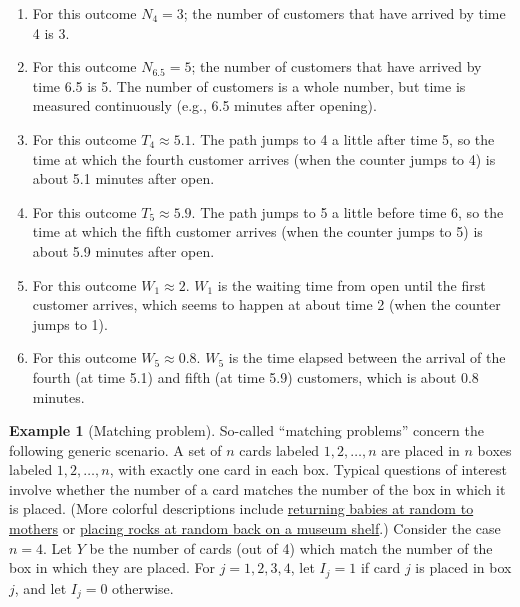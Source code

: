 \documentclass[
]{book}
\providecommand{\tightlist}{%
  \setlength{\itemsep}{0pt}\setlength{\parskip}{0pt}}
\theoremstyle{definition}
\theoremstyle{definition}
\newtheorem{example}{Example}[chapter]
\theoremstyle{definition}
\theoremstyle{remark}
\begin{document}
\begin{enumerate}
\def\labelenumi{\arabic{enumi}.}
\tightlist
\item
  For this outcome \(N_4=3\); the number of customers that have arrived by time 4 is 3.
\item
  For this outcome \(N_{6.5}=5\); the number of customers that have arrived by time 6.5 is 5. The number of customers is a whole number, but time is measured continuously (e.g., 6.5 minutes after opening).
\item
  For this outcome \(T_4\approx 5.1\). The path jumps to 4 a little after time 5, so the time at which the fourth customer arrives (when the counter jumps to 4) is about 5.1 minutes after open.
\item
  For this outcome \(T_5\approx 5.9\). The path jumps to 5 a little before time 6, so the time at which the fifth customer arrives (when the counter jumps to 5) is about 5.9 minutes after open.
\item
  For this outcome \(W_1\approx 2\). \(W_1\) is the waiting time from open until the first customer arrives, which seems to happen at about time 2 (when the counter jumps to 1).
\item
  For this outcome \(W_5\approx 0.8\). \(W_5\) is the time elapsed between the arrival of the fourth (at time 5.1) and fifth (at time 5.9) customers, which is about 0.8 minutes.
\end{enumerate}

\begin{example}[Matching problem]
\protect\hypertarget{exm:matching-rv}{}{\label{exm:matching-rv} {} }So-called ``matching problems'' concern the following generic scenario. A set of \(n\) cards labeled \(1, 2, \ldots, n\) are placed in \(n\) boxes labeled \(1, 2, \ldots, n\), with exactly one card in each box. Typical questions of interest involve whether the number of a card matches the number of the box in which it is placed. (More colorful descriptions include \href{http://www.rossmanchance.com/applets/randomBabies/RandomBabies.html}{returning babies at random to mothers} or \href{https://fivethirtyeight.com/features/everythings-mixed-up-can-you-sort-it-all-out/}{placing rocks at random back on a museum shelf}.) Consider the case \(n=4\). Let \(Y\) be the number of cards (out of 4) which match the number of the box in which they are placed. For \(j=1, 2, 3, 4\), let \(I_j=1\) if card \(j\) is placed in box \(j\), and let \(I_j=0\) otherwise.
\end{example}
\end{document}
